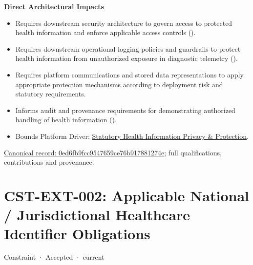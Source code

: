 \par\medskip\textbf{Direct Architectural Impacts}\par


\begin{itemize}


\item Requires downstream security architecture to govern access to protected health information and enforce applicable access controls (\href{\detokenize{../../../../../docs/markdown/01-motivation/requirements-constraints/master-requirements-catalogue.md}}{\texttt{}}).

\item Requires downstream operational logging policies and guardrails to protect health information from unauthorized exposure in diagnostic telemetry (\href{\detokenize{../../../../../docs/markdown/01-motivation/requirements-constraints/master-requirements-catalogue.md}}{\texttt{}}).

\item Requires platform communications and stored data representations to apply appropriate protection mechanisms according to deployment risk and statutory requirements.

\item Informs audit and provenance requirements for demonstrating authorized handling of health information (\href{\detokenize{../../../../../docs/markdown/01-motivation/requirements-constraints/master-requirements-catalogue.md}}{\texttt{}}).

\item Bounds Platform Driver: \href{\detokenize{../../../../../docs/markdown/01-motivation/drivers-assessments/drivers.md}}{Statutory Health Information Privacy \& Protection}.

\end{itemize}

{\footnotesize \href{../../../../continuum/motivation/constraint/0ed6fb9fcc9547659ce76b917881274e.md}{Canonical record: 0ed6fb9fcc9547659ce76b917881274e}; full qualifications, contributions and provenance.}\par
\section{CST-EXT-002: Applicable National / Jurisdictional Healthcare Identifier Obligations}

\label{element:edb1db6b18d84487ab48b9416f26e980}
{\small Constraint · Accepted · current}\par

